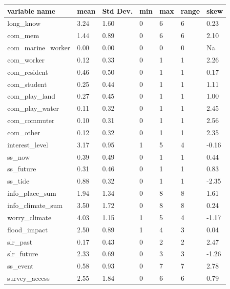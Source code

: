 \begin{center}
\begin{table}[h]
    \centering
    \begin{tabular}{|l|l|l|l|l|l|l|}
    \hline
        variable name & mean & Std Dev. & min & max & range & skew  \\ \hline
        long\_know & 3.24 & 1.60 & 0 & 6 & 6 & 0.23 \\ \hline
        com\_mem & 1.44 & 0.89 & 0 & 6 & 6 & 2.10  \\ \hline
        com\_marine\_worker & 0.00 & 0.00 & 0 & 0 & 0 & Na   \\ \hline
        com\_worker & 0.12 & 0.33 & 0 & 1 & 1 & 2.26  \\ \hline
        com\_resident & 0.46 & 0.50 & 0 & 1 & 1 & 0.17  \\ \hline
        com\_student & 0.25 & 0.44 & 0 & 1 & 1 & 1.11 \\ \hline
        com\_play\_land & 0.27 & 0.45 & 0 & 1 & 1 & 1.00   \\ \hline
        com\_play\_water & 0.11 & 0.32 & 0 & 1 & 1 & 2.45  \\ \hline
        com\_commuter & 0.10 & 0.31 & 0 & 1 & 1 & 2.56   \\ \hline
        com\_other & 0.12 & 0.32 & 0 & 1 & 1 & 2.35   \\ \hline
        interest\_level & 3.17 & 0.95 & 1 & 5 & 4 & -0.16 \\ \hline
        ss\_now & 0.39 & 0.49 & 0 & 1 & 1 & 0.44  \\ \hline
        ss\_future & 0.31 & 0.46 & 0 & 1 & 1 & 0.83 \\ \hline
        ss\_tide & 0.88 & 0.32 & 0 & 1 & 1 & -2.35 \\ \hline
        info\_place\_sum & 1.94 & 1.34 & 0 & 8 & 8 & 1.61 \\ \hline
        info\_climate\_sum & 3.50 & 1.72 & 0 & 8 & 8 & 0.24 \\ \hline
        worry\_climate & 4.03 & 1.15 & 1 & 5 & 4 & -1.17 \\ \hline
        flood\_impact & 2.50 & 0.89 & 1 & 4 & 3 & 0.04  \\ \hline
        slr\_past & 0.17 & 0.43 & 0 & 2 & 2 & 2.47  \\ \hline
        slr\_future & 2.33 & 0.69 & 0 & 3 & 3 & -1.26 \\ \hline
        ss\_event & 0.58 & 0.93 & 0 & 7 & 7 & 2.78  \\ \hline
        survey\_access & 2.55 & 1.84 & 0 & 6 & 6 & 0.79  \\ \hline

\end{tabular}
\end{table}
\end{center}

